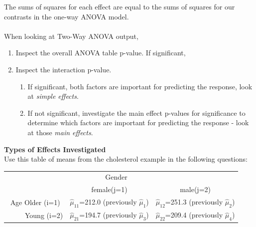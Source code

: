 The sums of squares for each effect are equal to the sums of squares for our contrasts in the one-way ANOVA model.\\~\\
When looking at Two-Way ANOVA output,
\begin{enumerate}
\item Inspect the overall ANOVA table p-value.  If significant,
\item Inspect the interaction p-value.  
\begin{enumerate}
\item If significant, both factors are important for predicting the response, look at \textit{simple effects}.
\item If not significant, investigate the main effect p-values for significance to determine which factors are important for predicting the response - look at those \textit{main effects}.
\end{enumerate}
\end{enumerate}

\newpage


\Large\textbf{Types of Effects Investigated}\large\\
Use this table of means from the cholesterol example in the following questions:
\begin{center}
\begin{tabular}{c|cc}
&~~~~Gender\\
&female(j=1) &male(j=2)\\\hline
Age Older (i=1) & $\hat{\mu}_{11}$=212.0 (previously $\hat{\mu}_{1}$)& $\hat{\mu}_{12}$=251.3 (previously $\hat{\mu}_{2}$)\\
~~~~~Young (i=2) & $\hat{\mu}_{21}$=194.7 (previously $\hat{\mu}_{3}$)& $\hat{\mu}_{22}$=209.4 (previously $\hat{\mu}_{4}$)
\end{tabular}
\end{center}

